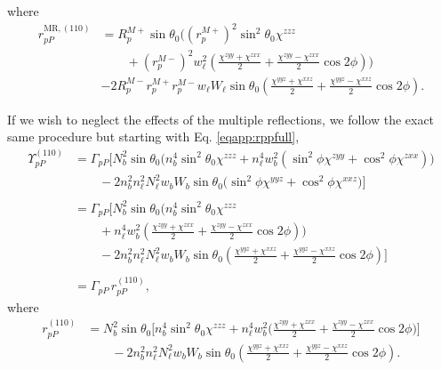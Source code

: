 where
\begin{equation}\label{eqapp:final-rpp.mr.110}
\begin{split}
r^{\mathrm{MR},(110)}_{pP} &=
R^{M+}_{p}\sin\theta_{0}
\bigg(
\left(r^{M+}_{p}\right)^{2}\sin^{2}\theta_{0}\chi^{zzz}\\
&\qquad+ \left(r^{M-}_{p}\right)^{2}w^{2}_{\ell}
\left(
\frac{\chi^{zyy} + \chi^{zxx}}{2} + \frac{\chi^{zyy} - \chi^{zxx}}{2}\cos2\phi
\right)
\bigg)\\
&- 2R^{M-}_{p}r^{M+}_{p}r^{M-}_{p}w_{\ell}W_{\ell}\sin\theta_{0}
\left(
\frac{\chi^{yyz} + \chi^{xxz}}{2} + \frac{\chi^{yyz} - \chi^{xxz}}{2}\cos2\phi
\right).
\end{split}
\end{equation}

If we wish to neglect the effects of the multiple reflections, we follow the
exact same procedure but starting with Eq. \eqref{eqapp:rppfull},
\begin{equation*}
\begin{split}
\Upsilon^{(110)}_{pP} &=
\Gamma_{pP}
\bigg[
N^{2}_{b}\sin\theta_{0}
\bigg(
n^{4}_{b}\sin^{2}\theta_{0}\chi^{zzz}
+ n^{4}_{\ell}w^{2}_{b}(\sin^{2}\phi\chi^{zyy} + \cos^{2}\phi\chi^{zxx})
\bigg)\\
&\qquad- 2n^{2}_{b}n^{2}_{\ell}N^{2}_{\ell}w_{b}W_{b}\sin\theta_{0}
\big(
\sin^{2}\phi\chi^{yyz} + \cos^{2}\phi\chi^{xxz}
\big)
\bigg]\\\\
&=
\Gamma_{pP}
\bigg[
N^{2}_{b}\sin\theta_{0}
\bigg(
n^{4}_{b}\sin^{2}\theta_{0}\chi^{zzz}\\
&\qquad+ n^{4}_{\ell}w^{2}_{b}
\left(
\frac{\chi^{zyy} + \chi^{zxx}}{2} + \frac{\chi^{zyy} - \chi^{zxx}}{2}\cos2\phi
\right)
\bigg)\\
&\qquad- 2n^{2}_{b}n^{2}_{\ell}N^{2}_{\ell}w_{b}W_{b}\sin\theta_{0}
\left(
\frac{\chi^{yyz} + \chi^{xxz}}{2} + \frac{\chi^{yyz} - \chi^{xxz}}{2}\cos2\phi
\right)
\bigg]\\\\
&= \Gamma_{pP}\,r^{(110)}_{pP},
\end{split}
\end{equation*}
where
\begin{equation}\label{eqapp:final-rpp.110}
\begin{split}
r^{(110)}_{pP} &= 
N^{2}_{b}\sin\theta_{0}
\bigg[
n^{4}_{b}\sin^{2}\theta_{0}\chi^{zzz}
+ n^{4}_{\ell}w^{2}_{b}
\bigg(
\frac{\chi^{zyy} + \chi^{zxx}}{2} + \frac{\chi^{zyy} - \chi^{zxx}}{2}\cos2\phi
\bigg)
\bigg]\\
&\qquad- 2n^{2}_{b}n^{2}_{\ell}N^{2}_{\ell}w_{b}W_{b}\sin\theta_{0}
\left(
\frac{\chi^{yyz} + \chi^{xxz}}{2} + \frac{\chi^{yyz} - \chi^{xxz}}{2}\cos2\phi
\right).
\end{split}
\end{equation}


